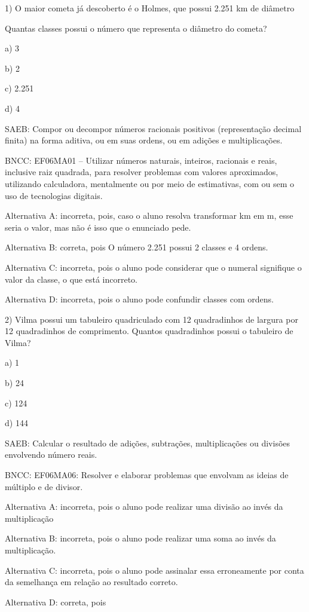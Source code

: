 1) O maior cometa já descoberto é o Holmes, que possui 2.251 km de
diâmetro

Quantas classes possui o número que representa o diâmetro do cometa?

a) 3

b) 2

c) 2.251

d) 4

SAEB: Compor ou decompor números racionais positivos (representação
decimal finita) na forma aditiva, ou em suas ordens, ou em adições e
multiplicações.

BNCC: EF06MA01 -- Utilizar números naturais, inteiros, racionais e
reais, inclusive raiz quadrada, para resolver problemas com valores
aproximados, utilizando calculadora, mentalmente ou por meio de
estimativas, com ou sem o uso de tecnologias digitais.

Alternativa A: incorreta, pois, caso o aluno resolva transformar km em
m, esse seria o valor, mas não é isso que o enunciado pede.

Alternativa B: correta, pois O número 2.251 possui 2 classes e 4 ordens.

Alternativa C: incorreta, pois o aluno pode considerar que o numeral
signifique o valor da classe, o que está incorreto.

Alternativa D: incorreta, pois o aluno pode confundir classes com
ordens.

2) Vilma possui um tabuleiro quadriculado com 12 quadradinhos de largura
por 12 quadradinhos de comprimento. Quantos quadradinhos possui o
tabuleiro de Vilma?

a) 1

b) 24

c) 124

d) 144

SAEB: Calcular o resultado de adições, subtrações, multiplicações ou
divisões envolvendo número reais.

BNCC: EF06MA06: Resolver e elaborar problemas que envolvam as ideias de
múltiplo e de divisor.

Alternativa A: incorreta, pois o aluno pode realizar uma divisão ao
invés da multiplicação

Alternativa B: incorreta, pois o aluno pode realizar uma soma ao invés
da multiplicação.

Alternativa C: incorreta, pois o aluno pode assinalar essa erroneamente
por conta da semelhança em relação ao resultado correto.

Alternativa D: correta, pois


